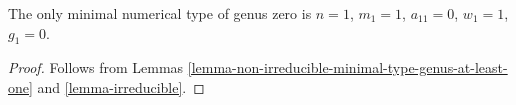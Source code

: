 \begin{lemma}
\label{lemma-genus-zero}
The only minimal numerical type of genus zero is
$n = 1$, $m_1 = 1$, $a_{11} = 0$, $w_1 = 1$, $g_1 = 0$.
\end{lemma}

\begin{proof}
Follows from Lemmas \ref{lemma-non-irreducible-minimal-type-genus-at-least-one}
and \ref{lemma-irreducible}.
\end{proof}
